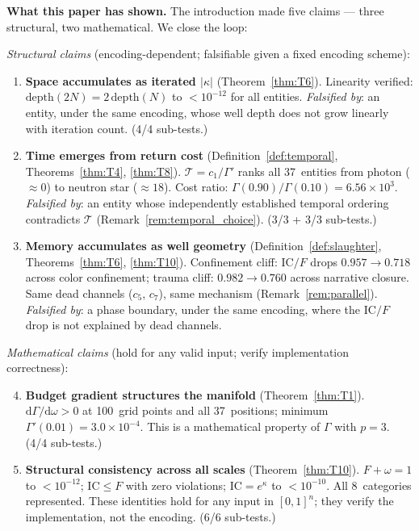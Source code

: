 \documentclass[
  aps,
  prd,
  twocolumn,
  superscriptaddress,
  nofootinbib,
  floatfix
]{revtex4-2}
\newcommand{\Gam}{\Gamma}
\newcommand{\dd}{\mathrm{d}}
\newcommand{\IC}{\mathrm{IC}}
\begin{document}
\textbf{What this paper has shown.}
The introduction made five claims --- three structural, two
mathematical.  We close the loop:

\emph{Structural claims} (encoding-dependent; falsifiable
given a fixed encoding scheme):

\begin{enumerate}
\item \textbf{Space accumulates as iterated $|\kappa|$}
  (Theorem~\ref{thm:T6}).
  Linearity verified: $\mathrm{depth}(2N) = 2\,\mathrm{depth}(N)$
  to $< 10^{-12}$ for all entities.
  \emph{Falsified by}: an entity, under the same encoding,
  whose well depth does not grow linearly with iteration
  count.  (4/4 sub-tests.)

\item \textbf{Time emerges from return cost}
  (Definition~\ref{def:temporal}, Theorems~\ref{thm:T4},
  \ref{thm:T8}).
  $\mathcal{T} = c_1/\Gam'$ ranks all 37~entities from
  photon ($\approx 0$) to neutron star ($\approx 18$).
  Cost ratio: $\Gam(0.90)/\Gam(0.10) = 6.56 \times 10^{3}$.
  \emph{Falsified by}: an entity whose independently
  established temporal ordering contradicts $\mathcal{T}$
  (Remark~\ref{rem:temporal_choice}).
  (3/3 + 3/3 sub-tests.)

\item \textbf{Memory accumulates as well geometry}
  (Definition~\ref{def:slaughter},
  Theorems~\ref{thm:T6}, \ref{thm:T10}).
  Confinement cliff: $\IC/F$ drops $0.957 \to 0.718$ across
  color confinement; trauma cliff: $0.982 \to 0.760$ across
  narrative closure.  Same dead channels ($c_5$, $c_7$), same
  mechanism (Remark~\ref{rem:parallel}).
  \emph{Falsified by}: a phase boundary, under the same
  encoding, where the $\IC/F$ drop is not explained by dead
  channels.
\end{enumerate}

\emph{Mathematical claims} (hold for any valid input;
verify implementation correctness):

\begin{enumerate}\setcounter{enumi}{3}
\item \textbf{Budget gradient structures the manifold}
  (Theorem~\ref{thm:T1}).
  $\dd\Gam/\dd\omega > 0$ at 100~grid points and all
  37~positions; minimum $\Gam'(0.01) = 3.0 \times 10^{-4}$.
  This is a mathematical property of $\Gam$ with $p = 3$.
  (4/4 sub-tests.)

\item \textbf{Structural consistency across all scales}
  (Theorem~\ref{thm:T10}).
  $F + \omega = 1$ to $< 10^{-12}$; $\IC \leq F$ with zero
  violations; $\IC = e^{\kappa}$ to $< 10^{-10}$.  All
  8~categories represented.  These identities hold for any
  input in $[0,1]^n$; they verify the implementation, not
  the encoding.  (6/6 sub-tests.)
\end{enumerate}
\end{document}
